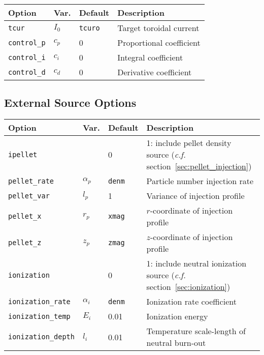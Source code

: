 \documentclass[letterpaper]{book}
\begin{document}
\begin{tabular}{llll}
  \textbf{Option}&\textbf{Var.}&\textbf{Default}&\textbf{Description}\\
  \hline
  \texttt{tcur}       & $I_0$ & \texttt{tcuro} & Target toroidal current\\
  \texttt{control\_p} & $c_p$ & 0              & Proportional coefficient\\
  \texttt{control\_i} & $c_i$ & 0              & Integral coefficient\\
  \texttt{control\_d} & $c_d$ & 0              & Derivative coefficient\\
\end{tabular}


\subsection{External Source Options}

\begin{tabular}{llll}
  \textbf{Option}&\textbf{Var.}&\textbf{Default}&\textbf{Description}\\
  \hline
  \texttt{ipellet}      & & 0    & \parbox[t]{2in}{1: include pellet density
    source (\textit{c.f.} section~\ref{sec:pellet_injection})}\\
  \texttt{pellet\_rate} & $\alpha_p$ & \texttt{denm} 
                                     & Particle number injection rate\\
  \texttt{pellet\_var}  & $l_p$      & 1    & Variance of  
                                              injection profile\\
  \texttt{pellet\_x}    & $r_p$      & \texttt{xmag} 
                                     & $r$-coordinate of injection profile\\
  \texttt{pellet\_z}    & $z_p$      & \texttt{zmag} 
                                     & $z$-coordinate of injection profile\\
  \texttt{ionization}   & & 0  & \parbox[t]{2in}{1: include neutral ionization
    source (\textit{c.f.} section~\ref{sec:ionization})}\\
  \texttt{ionization\_rate} & $\alpha_i$ & \texttt{denm} 
                                     & Ionization rate coefficient\\
  \texttt{ionization\_temp} & $E_i$   & 0.01 & Ionization energy\\
  \texttt{ionization\_depth}& $l_i$   & 0.01 & \parbox[t]{2in}{Temperature 
    scale-length of neutral burn-out}
\end{tabular}
\end{document}
